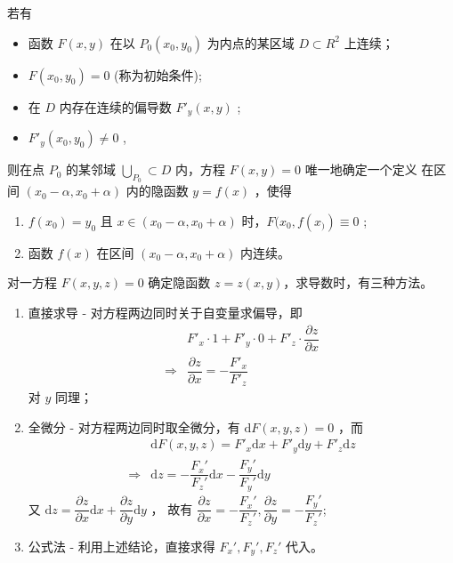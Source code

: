 \begin{Theo}[隐函数存在定理]

    若有
    \begin{itemize}
        \item 函数 $ F(x,y) $ 在以 $ P_0(x_0,y_0) $ 为内点的某区域 $ D\subset R^2 $ 上连续；
        \item $ F(x_0,y_0) = 0 $ (称为初始条件);
        \item 在 $ D $ 内存在连续的偏导数 $ F'_y(x,y) $ ;
        \item $ F'_y(x_0,y_0)\neq0 $ ,
    \end{itemize}
    则在点 $ P_0 $ 的某邻域 $ \bigcup_{P_0}\subset D $ 内，方程 $ F(x,y)=0 $ 唯一地确定一个定义
    在区间 $ (x_0-\alpha,x_0+\alpha) $ 内的隐函数 $ y = f(x) $ ，使得
    \begin{enumerate}
        \item $ f(x_0) = y_0 $ 且 $ x\in (x_0-\alpha,x_0+\alpha) $ 时，$ F(x_0,f(x_)) \equiv 0 $ ;
        \item 函数 $ f(x) $ 在区间 $ (x_0-\alpha,x_0+\alpha) $ 内连续。
    \end{enumerate}
\end{Theo}

对一方程 $ F(x,y,z) = 0 $ 确定隐函数 $ z = z(x,y) $，求导数时，有三种方法。

\begin{enumerate}
    \item 直接求导 - 对方程两边同时关于自变量求偏导，即\begin{equation*}
        \begin{aligned}
            &F'_x \cdot 1 + F'_y \cdot 0 + F'_z \cdot \dfrac{\partial z}{\partial x}\\
            \Rightarrow & \dfrac{\partial z}{\partial x} = -\dfrac{F'_x}{F'_z}
        \end{aligned}
    \end{equation*}
    对 $ y $ 同理；
    \item 全微分 - 对方程两边同时取全微分，有 $ \mathrm{d}F(x,y,z) = 0 $ ，而\begin{equation*}
        \begin{aligned}
            &\mathrm{d}F(x,y,z) = F'_x \mathrm{d}x + F'_y \mathrm{d}y + F'_z\mathrm{d}z\\ 
            \Rightarrow & \mathrm{d}z = -\dfrac{F_x'}{F_z'}\mathrm{d}x - \dfrac{F_y'}{F_y'}\mathrm{d}y
        \end{aligned}
    \end{equation*}
    又 $ \mathrm{d}z = \dfrac{\partial z}{\partial x}\mathrm{d}x + \dfrac{\partial z}{\partial y}\mathrm{d}y $ ，
    故有 $ \dfrac{\partial z}{\partial x} = -\dfrac{F_x'}{F_z'},
    \dfrac{\partial z}{\partial y} = -\dfrac{F_y'}{F_z'}$;
    \item 公式法 - 利用上述结论，直接求得 $ F_x',F_y',F_z' $ 代入。
\end{enumerate}

